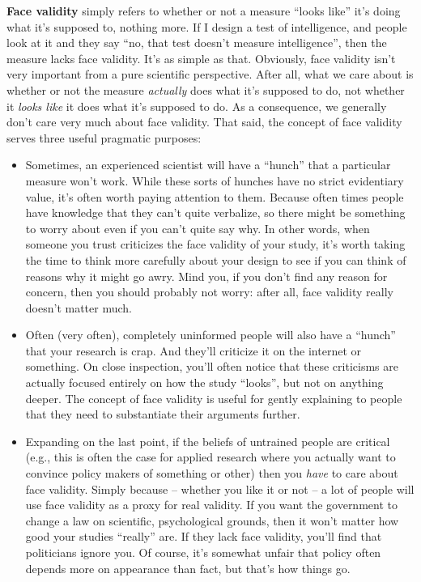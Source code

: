 \documentclass[]{book}
\begin{document}
\textbf{Face validity} simply refers to whether or not a measure ``looks like'' it's doing what it's supposed to, nothing more. If I design a test of intelligence, and people look at it and they say ``no, that test doesn't measure intelligence'', then the measure lacks face validity. It's as simple as that. Obviously, face validity isn't very important from a pure scientific perspective. After all, what we care about is whether or not the measure {\emph{actually}} does what it's supposed to do, not whether it {\emph{looks like}} it does what it's supposed to do. As a consequence, we generally don't care very much about face validity. That said, the concept of face validity serves three useful pragmatic purposes:

\begin{itemize}
\item
  Sometimes, an experienced scientist will have a ``hunch'' that a particular measure won't work. While these sorts of hunches have no strict evidentiary value, it's often worth paying attention to them. Because often times people have knowledge that they can't quite verbalize, so there might be something to worry about even if you can't quite say why. In other words, when someone you trust criticizes the face validity of your study, it's worth taking the time to think more carefully about your design to see if you can think of reasons why it might go awry. Mind you, if you don't find any reason for concern, then you should probably not worry: after all, face validity really doesn't matter much.
\item
  Often (very often), completely uninformed people will also have a ``hunch'' that your research is crap. And they'll criticize it on the internet or something. On close inspection, you'll often notice that these criticisms are actually focused entirely on how the study ``looks'', but not on anything deeper. The concept of face validity is useful for gently explaining to people that they need to substantiate their arguments further.
\item
  Expanding on the last point, if the beliefs of untrained people are critical (e.g., this is often the case for applied research where you actually want to convince policy makers of something or other) then you {\emph{have}} to care about face validity. Simply because -- whether you like it or not -- a lot of people will use face validity as a proxy for real validity. If you want the government to change a law on scientific, psychological grounds, then it won't matter how good your studies ``really'' are. If they lack face validity, you'll find that politicians ignore you. Of course, it's somewhat unfair that policy often depends more on appearance than fact, but that's how things go.
\end{itemize}
\end{document}
